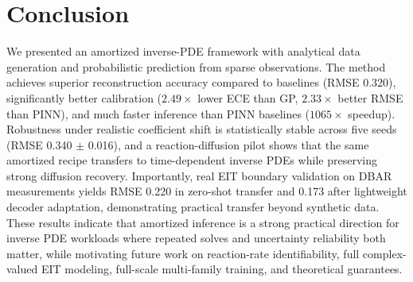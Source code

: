 \documentclass{article}
\begin{document}
\section{Conclusion}
We presented an amortized inverse-PDE framework with analytical data generation and probabilistic prediction from sparse observations. The method achieves superior reconstruction accuracy compared to baselines (RMSE 0.320), significantly better calibration ($2.49\times$ lower ECE than GP, $2.33\times$ better RMSE than PINN), and much faster inference than PINN baselines ($1065\times$ speedup). Robustness under realistic coefficient shift is statistically stable across five seeds (RMSE 0.340 $\pm$ 0.016), and a reaction-diffusion pilot shows that the same amortized recipe transfers to time-dependent inverse PDEs while preserving strong diffusion recovery. Importantly, real EIT boundary validation on DBAR measurements yields RMSE 0.220 in zero-shot transfer and 0.173 after lightweight decoder adaptation, demonstrating practical transfer beyond synthetic data. These results indicate that amortized inference is a strong practical direction for inverse PDE workloads where repeated solves and uncertainty reliability both matter, while motivating future work on reaction-rate identifiability, full complex-valued EIT modeling, full-scale multi-family training, and theoretical guarantees.



\end{document}
